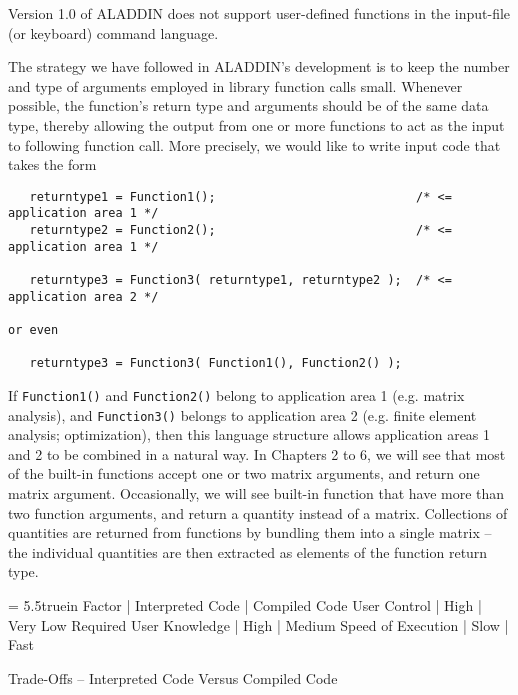 \vspace{0.15 in}
\noindent\hspace{0.5 in}
Version 1.0 of ALADDIN does not support user-defined
functions in the input-file (or keyboard) command language.

\vspace{0.15 in}
\noindent\hspace{0.50 in}
The strategy we have followed in ALADDIN's development is to keep
the number and type of arguments employed in library function calls small.
Whenever possible, the function's return type and arguments 
should be of the same data type, thereby allowing the output
from one or more functions to act as the input to following function call.
More precisely, we would like to write input code that takes the form

\begin{footnotesize} 
\begin{verbatim}
   returntype1 = Function1();                            /* <= application area 1 */
   returntype2 = Function2();                            /* <= application area 1 */

   returntype3 = Function3( returntype1, returntype2 );  /* <= application area 2 */

or even 

   returntype3 = Function3( Function1(), Function2() );
\end{verbatim}
\end{footnotesize} 

\vspace{0.15 in}\noindent
If {\tt Function1()} and {\tt Function2()} belong to application area 1 (e.g. matrix analysis),
and {\tt Function3()} belongs to application area 2 (e.g. finite element analysis; optimization),
then this language structure allows
application areas 1 and 2 to be combined in a natural way.
In Chapters 2 to 6, we will see that most of the built-in functions
accept one or two matrix arguments, and return one matrix argument.
Occasionally, we will see built-in function that have more than
two function arguments, and return a quantity instead of a matrix.
Collections of quantities are returned from functions by
bundling them into a single matrix -- the individual quantities
are then extracted as elements of the function return type.

\begin{table}[th]
\vspace{0.10 in}
\tablewidth = 5.5truein
\begintable
Factor                   | Interpreted Code | Compiled Code  \crthick
User Control             | High             | Very Low       \cr
Required User Knowledge  | High             | Medium         \cr
Speed of Execution       | Slow             | Fast           
\endtable
\vspace{0.01 in}
\caption{Trade-Offs -- Interpreted Code Versus Compiled Code}
\label{tab: tradeoffs-in-design}
\end{table}

